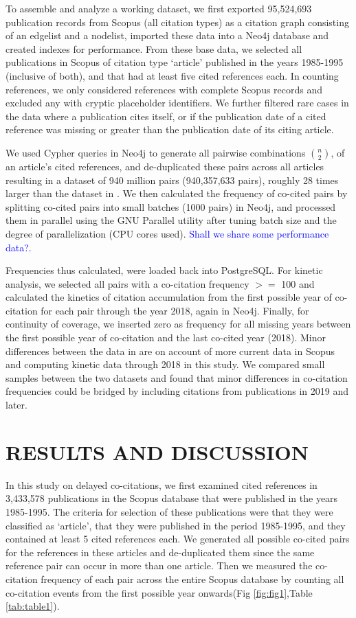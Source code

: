 \documentclass[utf8]{frontiersSCNS}
\begin{document}
To assemble and analyze a working dataset, we first exported 95,524,693 publication records from Scopus (all citation types) as a citation graph consisting of an edgelist and a nodelist, imported these data into a Neo4j database and  created indexes for performance. From these base data, we selected all publications in Scopus of citation type `article' published in the years 1985-1995 (inclusive of both), and that had at least five cited references each. In counting references, we only considered references with complete Scopus records and excluded any with cryptic placeholder identifiers. We further filtered rare cases in the data where a publication cites itself, or if the publication date of a cited reference was missing or greater than the publication date of its citing article. 

We used Cypher queries in Neo4j to generate all pairwise combinations $n\choose 2$, of an article's cited references, and de-duplicated these pairs across all articles resulting in a dataset of 940 million pairs (940,357,633 pairs), roughly 28 times larger than the dataset in \cite{devarakonda_2020}. We then calculated the frequency of co-cited pairs by splitting co-cited pairs into small batches (1000 pairs) in Neo4j, and processed them in parallel using the GNU Parallel utility after tuning batch size and the degree of parallelization (CPU cores used). \textcolor{blue}{Shall we share some performance data?}. 

Frequencies thus calculated, were loaded back into PostgreSQL. For kinetic analysis, we selected all pairs with a co-citation frequency $>=$ 100 and calculated the kinetics of citation accumulation from the first possible year of co-citation for each pair through the year 2018, again in Neo4j.  Finally, for continuity of coverage, we inserted zero as frequency for all missing years between the first possible year of co-citation and the last co-cited year (2018). Minor differences between the data in  \cite{devarakonda_2020} are on account of more current data in Scopus and computing kinetic data through 2018 in this study. We compared small samples between the two datasets and found that minor differences in co-citation frequencies could be bridged by including citations from publications in 2019 and later. 

\section{RESULTS AND DISCUSSION}

In this study on delayed co-citations, we first examined cited references in 3,433,578 publications in the Scopus database that were published in the years 1985-1995. The criteria for selection of these publications were that they were classified as `article', that they were published in the period 1985-1995, and they contained at least 5 cited references each. We generated all possible co-cited pairs for the references in these articles and de-duplicated them since the same reference pair can occur in more than one article. Then we measured the co-citation frequency of each pair across the entire Scopus database by counting all co-citation events from the first possible year onwards(Fig \ref{fig:fig1},Table \ref{tab:table1}).
\end{document}
